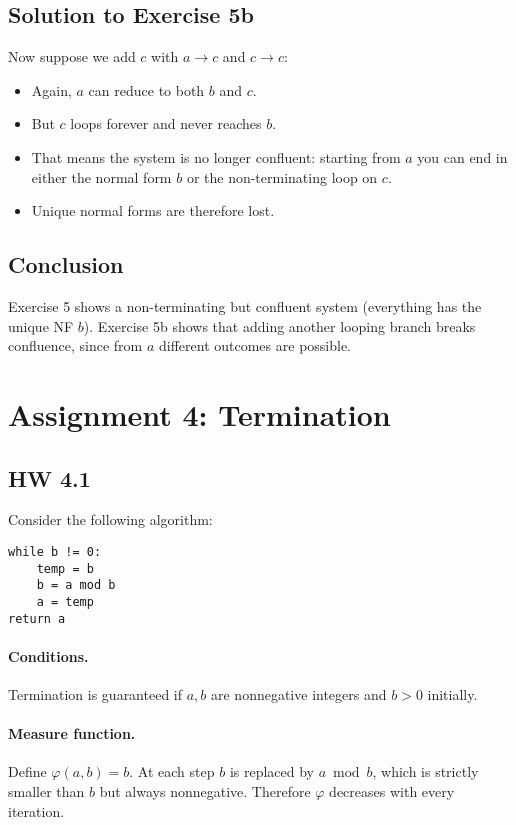 \documentclass[11pt]{article}
\begin{document}
\subsection*{Solution to Exercise 5b}
Now suppose we add $c$ with $a\to c$ and $c\to c$:
\begin{itemize}
  \item Again, $a$ can reduce to both $b$ and $c$.
  \item But $c$ loops forever and never reaches $b$.
  \item That means the system is no longer confluent: starting from $a$ you can end
    in either the normal form $b$ or the non-terminating loop on $c$.
  \item Unique normal forms are therefore lost.
\end{itemize}

\subsection*{Conclusion}
Exercise 5 shows a non-terminating but confluent system (everything has the unique NF $b$).  
Exercise 5b shows that adding another looping branch breaks confluence, since from $a$
different outcomes are possible.

\section{Assignment 4: Termination}

\subsection{HW 4.1}
Consider the following algorithm:
\begin{verbatim}
while b != 0:
    temp = b
    b = a mod b
    a = temp
return a
\end{verbatim}

\paragraph{Conditions.} Termination is guaranteed if $a, b$ are nonnegative integers and $b > 0$ initially.

\paragraph{Measure function.} Define $\varphi(a,b) = b$.  
At each step $b$ is replaced by $a \bmod b$, which is strictly smaller than $b$ but always nonnegative. Therefore $\varphi$ decreases with every iteration.
\end{document}
